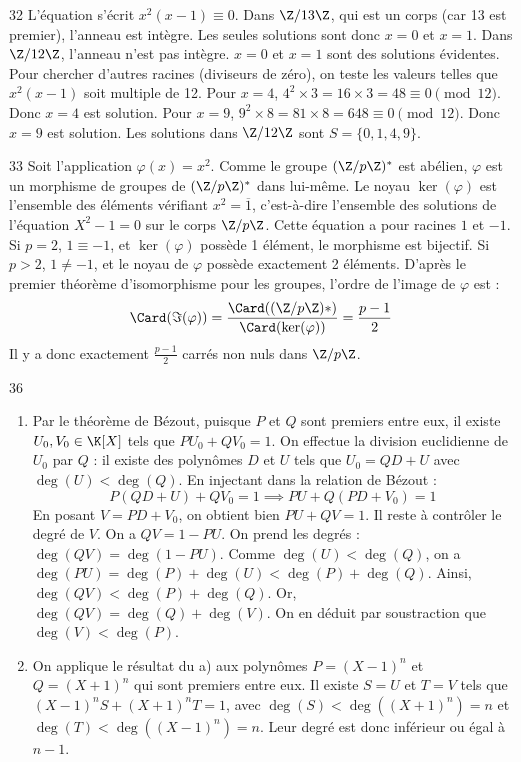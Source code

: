 \begin{correction}{32}
L'équation s'écrit $x^2(x-1) \equiv 0$.
Dans $\Z/13\Z$, qui est un corps (car 13 est premier), l'anneau est intègre. Les seules solutions sont donc $x=0$ et $x=1$.
Dans $\Z/12\Z$, l'anneau n'est pas intègre. $x=0$ et $x=1$ sont des solutions évidentes.
Pour chercher d'autres racines (diviseurs de zéro), on teste les valeurs telles que $x^2(x-1)$ soit multiple de 12.
Pour $x=4$, $4^2 \times 3 = 16 \times 3 = 48 \equiv 0 \pmod{12}$. Donc $x=4$ est solution.
Pour $x=9$, $9^2 \times 8 = 81 \times 8 = 648 \equiv 0 \pmod{12}$. Donc $x=9$ est solution.
Les solutions dans $\Z/12\Z$ sont $S = \{0, 1, 4, 9\}$.
\end{correction}

\begin{correction}{33}
Soit l'application $\varphi(x) = x^2$. Comme le groupe $(\Z/p\Z)^*$ est abélien, $\varphi$ est un morphisme de groupes de $(\Z/p\Z)^*$ dans lui-même. 
Le noyau $\ker(\varphi)$ est l'ensemble des éléments vérifiant $x^2 = \overline{1}$, c'est-à-dire l'ensemble des solutions de l'équation $X^2 - 1 = 0$ sur le corps $\Z/p\Z$. 
Cette équation a pour racines $1$ et $-1$. 
Si $p=2$, $1 \equiv -1$, et $\ker(\varphi)$ possède 1 élément, le morphisme est bijectif. 
Si $p>2$, $1 \neq -1$, et le noyau de $\varphi$ possède exactement 2 éléments. 
D'après le premier théorème d'isomorphisme pour les groupes, l'ordre de l'image de $\varphi$ est :
\[\Card(\Im(\varphi)) = \frac{\Card((\Z/p\Z)*)}{\Card(\ker(\varphi))} = \frac{p-1}{2}\] 
Il y a donc exactement $\frac{p-1}{2}$ carrés non nuls dans $\Z/p\Z$. 
\end{correction}

\begin{correction}{36}
\begin{enumerate}
 \item[a)] Par le théorème de Bézout, puisque $P$ et $Q$ sont premiers entre eux, il existe $U_0, V_0 \in \K[X]$ tels que $P U_0 + Q V_0 = 1$. 
 On effectue la division euclidienne de $U_0$ par $Q$ : il existe des polynômes $D$ et $U$ tels que $U_0 = Q D + U$ avec $\deg(U) < \deg(Q)$. 
 En injectant dans la relation de Bézout :
 \[P(QD + U) + Q V_0 = 1 \implies PU + Q(PD + V_0) = 1\] 
 En posant $V = PD + V_0$, on obtient bien $PU + QV = 1$. 
 Il reste à contrôler le degré de $V$. On a $QV = 1 - PU$. 
 On prend les degrés : $\deg(QV) = \deg(1 - PU)$. Comme $\deg(U) < \deg(Q)$, on a $\deg(PU) = \deg(P) + \deg(U) < \deg(P) + \deg(Q)$. 
 Ainsi, $\deg(QV) < \deg(P) + \deg(Q)$. Or, $\deg(QV) = \deg(Q) + \deg(V)$. 
 On en déduit par soustraction que $\deg(V) < \deg(P)$. 
 
 \item[b)] On applique le résultat du a) aux polynômes $P = (X-1)^n$ et $Q = (X+1)^n$ qui sont premiers entre eux. 
 Il existe $S = U$ et $T = V$ tels que $(X-1)^n S + (X+1)^n T = 1$, avec $\deg(S) < \deg((X+1)^n) = n$ et $\deg(T) < \deg((X-1)^n) = n$. 
 Leur degré est donc inférieur ou égal à $n-1$. 
\end{enumerate}
\end{correction}

